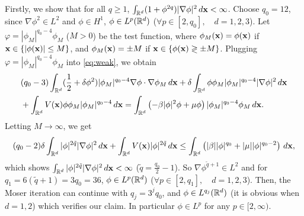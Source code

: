 \documentclass{elsarticle}
\newcommand{\bx}{{\bf x} }
\begin{document}
Firstly, we show that   for all $q\ge1$, $\int_{\Bbb R^d}(1+\phi^{2q})|\nabla\phi|^2\,d\bx<\infty$.
 Choose $q_0=12$, since $\nabla\phi^2\in L^2$ and $\phi\in H^1$, $\phi\in L^{p}(\Bbb R^d)$ ($\forall p\in[2,q_0],\quad d=1,2,3$).
 Let $\varphi=|\phi_M|^{q_0-4}\phi_M$ ($M>0$) be the test function, where $\phi_M(\bx)=\phi(\bx)$ if $\bx\in\{|\phi(\bx)|\leq M\}$,
and $\phi_M(\bx)=\pm M$ if $\bx\in\{\phi(\bx)\gtrless \pm M\}$. Plugging $\varphi=|\phi_M|^{q_0-4}\phi_M$ into \eqref{eq:weak}, we obtain
\begin{align*}
&(q_0-3)\int_{\Bbb R^d}(\frac12+\delta\phi^2)|\phi_M|^{q_0-4}\nabla\phi\cdot\nabla\phi_M\,d\bx+\delta\int_{\Bbb R^d}\phi\phi_M|\phi_M|^{q_0-4}|\nabla\phi|^2\,d\bx\\
&+\int_{\Bbb R^d}V(\bx)\phi\phi_M|\phi_M|^{q_0-4}\,d\bx=
\int_{\Bbb R^d}\left(-\beta|\phi|^2\phi+\mu\phi\right)|\phi_M|^{q_0-4}\phi_M\,d\bx.
\end{align*}
Letting $M\to\infty$, we get
\begin{equation}\label{eq:test}
(q_0-2)\delta\int_{\Bbb R^d}|\phi|^{2\tilde{q}}|\nabla\phi|^2\,d\bx+\int_{\Bbb R^d}V(\bx)|\phi|^{2\tilde{q}}\,d\bx\leq
\int_{\Bbb R^d}\left(|\beta| |\phi|^{q_0}+|\mu||\phi|^{q_0-2}\right)\,d\bx,
\end{equation}
which shows $\int_{\Bbb R^d}|\phi|^{{2\tilde{q}}}|\nabla\phi|^2\,d\bx<\infty$ ($\tilde{q}=\frac{q_0}{2}-1$). So $\nabla \phi^{\tilde{q}+1}\in L^2$
 and for $q_1=6(\tilde{q}+1)=3q_0=36$, $\phi\in L^{p}(\Bbb R^d)$ ($\forall p\in[2,q_1],\quad d=1,2,3$). Then, the Moser
iteration can continue with $q_j=3^jq_0$, and $\phi\in L^{q_j}(\Bbb R^d)$ (it is obvious when $d=1,2$) which verifies our claim.
In particular $\phi\in L^p$ for any $p\in[2,\infty)$.
\end{document}
